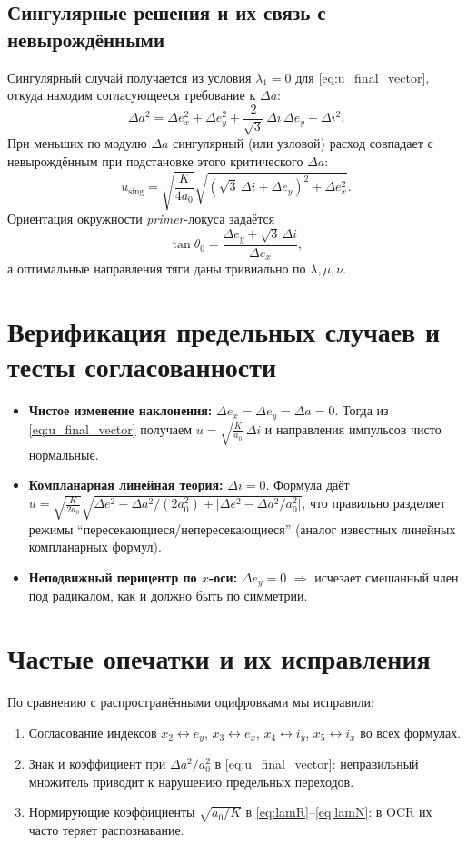 \documentclass[12pt,a4paper]{article}
\begin{document}
\subsection{Сингулярные решения и их связь с невырождёнными}
Сингулярный случай получается из условия $\lambda_1=0$ для \eqref{eq:u_final_vector}, откуда находим согласующееся требование к $\Delta a$:
\begin{equation}
\Delta a^2=\Delta e_x^2+\Delta e_y^2+\frac{2}{\sqrt3}\,\Delta i\,\Delta e_y-\Delta i^2.
\end{equation}
При меньших по модулю $\Delta a$ сингулярный (или узловой) расход совпадает с невырождённым при подстановке этого критического $\Delta a$:
\begin{equation}
u_{\mathrm{sing}}=\sqrt{\frac{K}{4a_0}}\sqrt{(\sqrt3\,\Delta i+\Delta e_y)^2+\Delta e_x^2}.
\end{equation}
Ориентация окружности \emph{primer}-локуса задаётся
\begin{equation}
\tan\theta_0=\frac{\Delta e_y+\sqrt3\,\Delta i}{\Delta e_x},
\end{equation}
а оптимальные направления тяги даны тривиально по $\lambda,\mu,\nu$.

\section{Верификация предельных случаев и тесты согласованности}
\begin{itemize}
\item \textbf{Чистое изменение наклонения:} $\Delta e_x=\Delta e_y=\Delta a=0$. Тогда из \eqref{eq:u_final_vector} получаем $u=\sqrt{\frac{K}{a_0}}\,\Delta i$ и направления импульсов чисто нормальные.
\item \textbf{Компланарная линейная теория:} $\Delta i=0$. Формула даёт
$u=\sqrt{\frac{K}{2a_0}}\sqrt{\Delta e^2-\Delta a^2/(2a_0^2)+\bigl|\Delta e^2-\Delta a^2/a_0^2\bigr|}$,
что правильно разделяет режимы ``пересекающиеся/непересекающиеся'' (аналог известных линейных компланарных формул).
\item \textbf{Неподвижный перицентр по $x$-оси:} $\Delta e_y=0$ $\Rightarrow$ исчезает смешанный член под радикалом, как и должно быть по симметрии.
\end{itemize}

\section{Частые опечатки и их исправления}
По сравнению с распространёнными оцифровками мы исправили:
\begin{enumerate}
\item Согласование индексов $x_2\leftrightarrow e_y$, $x_3\leftrightarrow e_x$, $x_4\leftrightarrow i_y$, $x_5\leftrightarrow i_x$ во всех формулах.
\item Знак и коэффициент при $\Delta a^2/a_0^2$ в \eqref{eq:u_final_vector}: неправильный множитель приводит к нарушению предельных переходов.
\item Нормирующие коэффициенты $\sqrt{a_0/K}$ в \eqref{eq:lamR}--\eqref{eq:lamN}: в OCR их часто теряет распознавание.
\end{enumerate}
\end{document}
